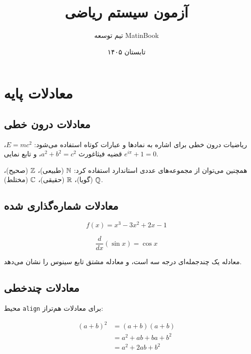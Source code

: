\documentclass{matinbook}
\title{آزمون سیستم ریاضی}
\author{تیم توسعه MatinBook}
\date{تابستان ۱۴۰۵}
\begin{document}
    
    \maketitle
    
    \chapter{معادلات پایه}
    
    \section{معادلات درون خطی}
    
    ریاضیات درون خطی برای اشاره به نمادها و عبارات کوتاه
    استفاده می‌شود: $E = mc^{2}$، قضیه فیثاغورث
    $a^{2} + b^{2} = c^{2}$، و تابع نمایی $e^{i\pi} + 1 = 0$.
    
    همچنین می‌توان از مجموعه‌های عددی استاندارد استفاده کرد:
    $\mathbb{N}$ (طبیعی)، $\mathbb{Z}$ (صحیح)، $\mathbb{Q}$ (گویا)،
    $\mathbb{R}$ (حقیقی)، $\mathbb{C}$ (مختلط).
    
    \section{معادلات شماره‌گذاری شده}
    
    \begin{equation}
        f(x) = x^{3} - 3x^{2} + 2x - 1
        \label{eq:cubic}
    \end{equation}
    
    \begin{equation}
        \frac{d}{dx}\left( \sin x \right) = \cos x
        \label{eq:derivative-sin}
    \end{equation}
    
    معادله  یک چندجمله‌ای درجه سه است،
    و معادله  مشتق تابع سینوس
    را نشان می‌دهد.
    
    \section{معادلات چندخطی}
    
    محیط \texttt{align} برای معادلات هم‌تراز:
    
    \begin{align}
        (a + b)^{2} &= (a + b)(a + b) \nonumber \\
        &= a^{2} + ab + ba + b^{2} \nonumber \\
        &= a^{2} + 2ab + b^{2} \label{eq:binomial}
    \end{align}
    
\end{document}
